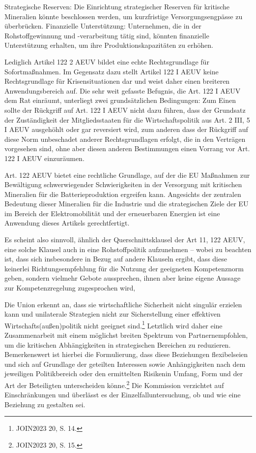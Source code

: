 \documentclass[12pt,a4paper,oneside]{book} %
\begin{document}
Strategische Reserven: Die Einrichtung strategischer Reserven für kritische Mineralien könnte beschlossen werden, um kurzfristige Versorgungsengpässe zu überbrücken. Finanzielle Unterstützung: Unternehmen, die in der Rohstoffgewinnung und -verarbeitung tätig sind, könnten finanzielle Unterstützung erhalten, um ihre Produktionskapazitäten zu erhöhen.
	
Lediglich Artikel 122 2 AEUV bildet eine echte Rechtsgrundlage für Sofortmaßnahmen. Im Gegensatz dazu stellt Artikel 122 I AEUV keine Rechtsgrundlage für Krisensituationen dar und weist daher einen breiteren Anwendungsbereich auf. Die sehr weit gefasste Befugnis, die Art. 122 I AEUV dem Rat einräumt, unterliegt zwei grundsätzlichen Bedingungen: Zum Einen sollte der Rückgriff auf Art. 122 I AEUV nicht dazu führen, dass der Grundsatz der Zuständigkeit der Mitgliedsstaaten für die Wirtschaftspolitik aus Art. 2 III, 5 I AEUV ausgehöhlt oder gar reversiert wird, zum anderen dass der Rückgriff auf diese Norm unbeschadet anderer Rechtsgrundlagen erfolgt, die in den Verträgen vorgesehen sind, ohne aber diesen anderen Bestimmungen einen Vorrang vor Art. 122 I AEUV einzuräumen.\autocite{chamon_anwendung_2023}
	
Art. 122 AEUV bietet eine rechtliche Grundlage, auf der die EU Maßnahmen zur Bewältigung schwerwiegender Schwierigkeiten in der Versorgung mit kritischen Mineralien für die Batterieproduktion ergreifen kann. Angesichts der zentralen Bedeutung dieser Mineralien für die Industrie und die strategischen Ziele der EU im Bereich der Elektromobilität und der erneuerbaren Energien ist eine Anwendung dieses Artikels gerechtfertigt.
	
Es scheint also sinnvoll, ähnlich der Querschnittsklausel der Art 11, 122 AEUV, eine solche Klausel auch in eine Rohstoffpolitik aufzunehmen -- wobei zu beachten ist, dass sich insbesondere in Bezug auf andere Klauseln ergibt, dass diese keinerlei Richtungsempfehlung für die Nutzung der geeigneten Kompetenznorm geben, sondern vielmehr Gebote aussprechen, ihnen aber keine eigene Aussage zur Kompetenzregelung zugesprochen wird,\autocite[39]{callies_umweltrecht_2022}

Die Union erkennt an, dass sie wirtschaftliche Sicherheit nicht singulär erzielen kann und unilaterale Strategien nicht zur Sicherstellung einer effektiven Wirtschafts(außen)politik nicht geeignet sind.\footnote{JOIN2023 20, S. 14.} Letztlich wird daher eine \glqq Zusammenarbeit mit einem möglichst breiten Spektrum von Partnern\grqq empfohlen, um die kritischen Abhängigkeiten in strategischen Bereichen zu reduzieren. Bemerkenswert ist hierbei die Formulierung, dass diese Beziehungen \glqq flexibel\grqq seien und sich auf Grundlage der geteilten Interessen sowie Anhängigkeiten \glqq nach dem jeweiligen Politikbereich oder den ermittelten Risiken\grqq in Umfang, Form und der Art der Beteiligten unterscheiden könne.\footnote{JOIN2023 20, S. 15.} Die Kommission verzichtet auf Einschränkungen und überlässt es der Einzelfalluntersuchung, ob und wie eine Beziehung zu gestalten sei.
\end{document}
